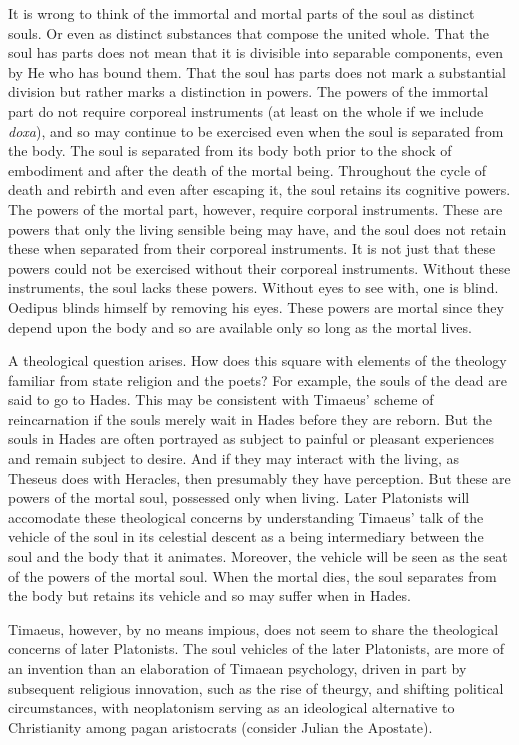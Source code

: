 It is wrong to think of the immortal and mortal parts of the soul as distinct souls. Or even as distinct substances that compose the united whole. That the soul has parts does not mean that it is divisible into separable components, even by He who has bound them. That the soul has parts does not mark a substantial division but rather marks a distinction in powers. The powers of the immortal part do not require corporeal instruments (at least on the whole if we include \emph{doxa}), and so may continue to be exercised even when the soul is separated from the body. The soul is separated from its body both prior to the shock of embodiment and after the death of the mortal being. Throughout the cycle of death and rebirth and even after escaping it, the soul retains its cognitive powers. The powers of the mortal part, however, require corporal instruments. These are powers that only the living sensible being may have, and the soul does not retain these when separated from their corporeal instruments. It is not just that these powers could not be exercised without their corporeal instruments. Without these instruments, the soul lacks these powers. Without eyes to see with, one is blind. Oedipus blinds himself by removing his eyes. These powers are mortal since they depend upon the body and so are available only so long as the mortal lives.

A theological question arises. How does this square with elements of the theology familiar from state religion and the poets? For example, the souls of the dead are said to go to Hades. This may be consistent with Timaeus' scheme of reincarnation if the souls merely wait in Hades before they are reborn. But the souls in Hades are often portrayed as subject to painful or pleasant experiences and remain subject to desire. And if they may interact with the living, as Theseus does with Heracles, then presumably they have perception. But these are powers of the mortal soul, possessed only when living. Later Platonists will accomodate these theological concerns by understanding Timaeus' talk of the vehicle of the soul in its celestial descent as a being intermediary between the soul and the body that it animates. Moreover, the vehicle will be seen as the seat of the powers of the mortal soul. When the mortal dies, the soul separates from the body but retains its vehicle and so may suffer when in Hades.

Timaeus, however, by no means impious, does not seem to share the theological concerns of later Platonists. The soul vehicles of the later Platonists, are more of an invention than an elaboration of Timaean psychology, driven in part by subsequent religious innovation, such as the rise of theurgy, and shifting political circumstances, with neoplatonism serving as an ideological alternative to Christianity among pagan aristocrats (consider Julian the Apostate).

